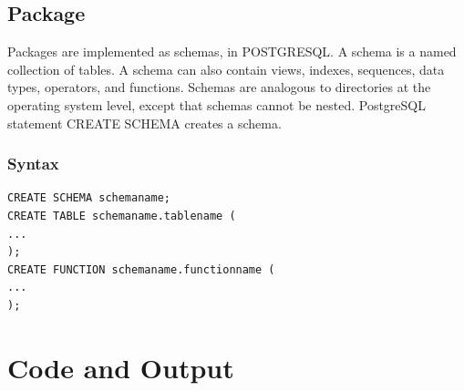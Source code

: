 \subsection{Package}

Packages are implemented as schemas, in POSTGRESQL. A schema is a named collection of tables. A schema can also contain views, indexes, sequences, data types, operators, and functions. Schemas are analogous to directories at the operating system level, except that schemas cannot be nested. PostgreSQL statement CREATE SCHEMA creates a schema.

\subsubsection{Syntax}

\begin{verbatim}
CREATE SCHEMA schemaname;
CREATE TABLE schemaname.tablename (
...
);
CREATE FUNCTION schemaname.functionname (
...
);
\end{verbatim}

\section{{Code and Output}}

